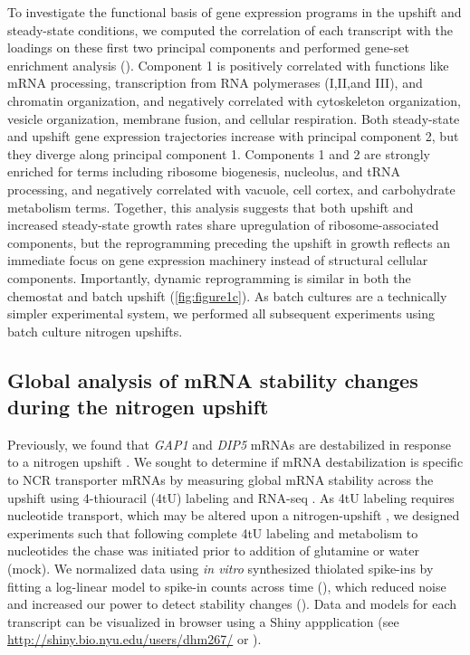 To investigate the functional basis of gene expression programs
in the upshift and steady-state conditions, we computed the
correlation of each transcript with the loadings on these first two
principal components and performed gene-set enrichment analysis
(). 
Component 1 is positively correlated with functions like
mRNA processing, transcription from RNA polymerases (I,II,and III),
and chromatin organization, and negatively correlated with
cytoskeleton organization,
vesicle organization, membrane fusion, and cellular respiration.
Both steady-state and upshift gene expression
trajectories increase with principal component 2, but they diverge
along principal component 1. Components 1 and 2 are 
strongly enriched for terms including ribosome biogenesis, 
nucleolus, and
tRNA processing, and negatively correlated with
vacuole, cell cortex, and carbohydrate metabolism terms. 
Together, this analysis suggests that both upshift and
increased steady-state growth rates share upregulation of
ribosome-associated components, but the reprogramming
preceding the upshift in growth reflects an immediate focus on 
gene expression machinery instead of structural cellular components.
Importantly,
dynamic reprogramming is similar in both the chemostat and batch
upshift (\autoref{fig:figure1c}). As batch cultures are a technically
simpler experimental system, we performed all subsequent experiments
using batch culture nitrogen upshifts. 

\label{subsection:pcaGoCorr}

\subsection{Global analysis of mRNA stability changes during the
nitrogen upshift}

Previously, we found that \textit{GAP1} and \textit{DIP5} mRNAs 
are destabilized in
response to a nitrogen upshift \parencite{airoldi2016steady}. We sought to
determine if mRNA destabilization is specific to NCR transporter
mRNAs by measuring global mRNA stability across the upshift
using 4-thiouracil (4tU) labeling and RNA-seq 
\parencite{neymotin2014determination,munchel2011dynamic}.
As 4tU labeling requires nucleotide transport, which may be altered
upon a nitrogen-upshift \parencite{hein1995npi1}, we designed experiments such
that following complete 4tU labeling and metabolism to nucleotides 
the chase was initiated prior to addition of glutamine or water (mock).
We normalized data using \textit{in vitro} synthesized thiolated 
spike-ins by fitting a log-linear model to spike-in counts
across time (), which reduced noise and increased
our power to detect stability changes ().
Data and models for each transcript can be visualized in browser
using a Shiny appplication (see
\url{http://shiny.bio.nyu.edu/users/dhm267/} or  ). 

